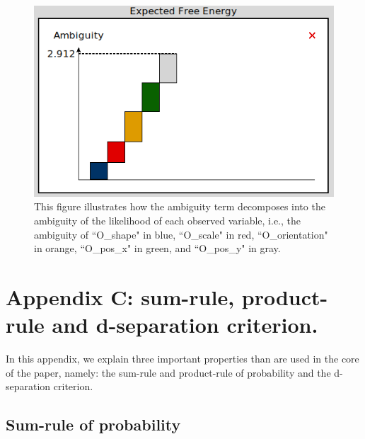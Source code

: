 \documentclass[twoside,11pt]{article}
\begin{document}
\begin{figure}[H]
	\begin{center}
	\includegraphics[scale=0.5]{ambiguity_decomposition.png}
	\end{center}
  \caption{This figure illustrates how the ambiguity term decomposes into the ambiguity of the likelihood of each observed variable, i.e., the ambiguity of ``O\_shape" in blue, ``O\_scale" in red, ``O\_orientation" in orange, ``O\_pos\_x" in green, and ``O\_pos\_y" in gray.}
   \label{fig:ambiguity_decomposition}
\end{figure}

\section*{Appendix C: sum-rule, product-rule and d-separation criterion.}

In this appendix, we explain three important properties than are used in the core of the paper, namely: the sum-rule and product-rule of probability and the d-separation criterion.

\subsection*{Sum-rule of probability}
\end{document}
